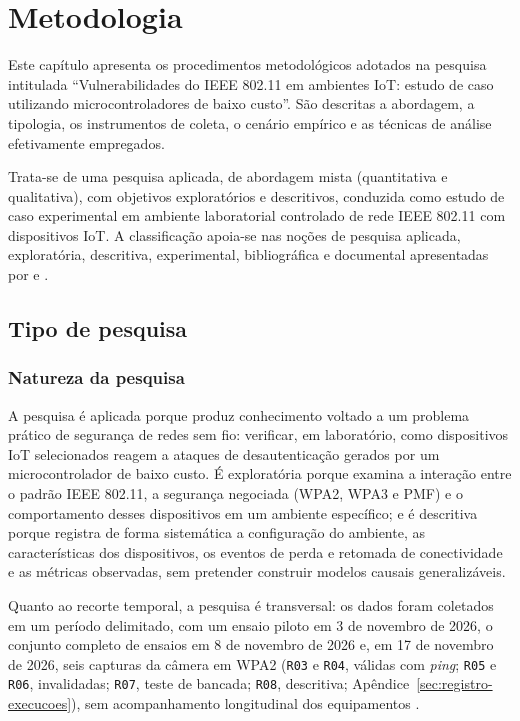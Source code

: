 \chapter{Metodologia}
\label{cap:metodologia}

Este capítulo apresenta os procedimentos metodológicos adotados na pesquisa intitulada ``Vulnerabilidades do IEEE 802.11 em ambientes IoT: estudo de caso utilizando microcontroladores de baixo custo''. São descritas a abordagem, a tipologia, os instrumentos de coleta, o cenário empírico e as técnicas de análise efetivamente empregados.

Trata-se de uma pesquisa aplicada, de abordagem mista (quantitativa e qualitativa), com objetivos exploratórios e descritivos, conduzida como estudo de caso experimental em ambiente laboratorial controlado de rede IEEE 802.11 com dispositivos IoT. A classificação apoia-se nas noções de pesquisa aplicada, exploratória, descritiva, experimental, bibliográfica e documental apresentadas por  e .

\section{Tipo de pesquisa}

\subsection{Natureza da pesquisa}

A pesquisa é aplicada porque produz conhecimento voltado a um problema prático de segurança de redes sem fio: verificar, em laboratório, como dispositivos IoT selecionados reagem a ataques de desautenticação gerados por um microcontrolador de baixo custo. É exploratória porque examina a interação entre o padrão IEEE 802.11, a segurança negociada (WPA2, WPA3 e PMF) e o comportamento desses dispositivos em um ambiente específico; e é descritiva porque registra de forma sistemática a configuração do ambiente, as características dos dispositivos, os eventos de perda e retomada de conectividade e as métricas observadas, sem pretender construir modelos causais generalizáveis.

Quanto ao recorte temporal, a pesquisa é transversal: os dados foram coletados em um período delimitado, com um ensaio piloto em 3 de novembro de 2026, o conjunto completo de ensaios em 8 de novembro de 2026 e, em 17 de novembro de 2026, seis capturas da câmera em WPA2 (\texttt{R03} e \texttt{R04}, válidas com \textit{ping}; \texttt{R05} e \texttt{R06}, invalidadas; \texttt{R07}, teste de bancada; \texttt{R08}, descritiva; Apêndice~\ref{sec:registro-execucoes}), sem acompanhamento longitudinal dos equipamentos \cite{ProdanovFreitas2013,Gil2002}.

